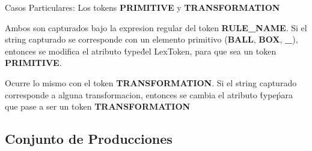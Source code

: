 Casos Particulares: Los tokens \textbf{PRIMITIVE} y \textbf{TRANSFORMATION}

Ambos son capturados bajo la expresion regular del token \textbf{RULE\_NAME}.
Si el string capturado se corresponde con un elemento primitivo (\textbf{BALL}, \textbf{BOX}, \textbf{\_}), entonces se modifica el atributo \'type\' del LexToken, para que sea un token \textbf{PRIMITIVE}.

Ocurre lo mismo con el token \textbf{TRANSFORMATION}. Si el string capturado corresponde a alguna transformacion, entonces se cambia el atributo \'type\' para que pase a ser un token \textbf{TRANSFORMATION}


\noindent



\newpage
\subsection{Conjunto de Producciones}

